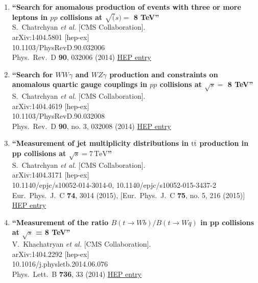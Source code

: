 \documentclass{article}
\begin{document}
\begin{enumerate}
\item%
{\bf ``Search for anomalous production of events with three or more leptons in $pp$ collisions at $\sqrt(s) =$ 8 TeV''}
  \\{}S.~Chatrchyan {\it et al.} [CMS Collaboration].
  \\{}arXiv:1404.5801 [hep-ex]
    \\{}10.1103/PhysRevD.90.032006
\\{}Phys.\ Rev.\ D {\bf 90}, 032006 (2014) %
\href{http://inspirehep.net/record/1291940}{HEP entry}


\item%
{\bf ``Search for $WW \gamma$ and $WZ \gamma$ production and constraints on anomalous quartic gauge couplings in $pp$ collisions at $\sqrt s =$ 8 TeV''}
  \\{}S.~Chatrchyan {\it et al.} [CMS Collaboration].
  \\{}arXiv:1404.4619 [hep-ex]
    \\{}10.1103/PhysRevD.90.032008
\\{}Phys.\ Rev.\ D {\bf 90}, no. 3, 032008 (2014) %
\href{http://inspirehep.net/record/1291135}{HEP entry}


\item%
{\bf ``Measurement of jet multiplicity distributions in $\mathrm {t}\overline{\mathrm {t}}$ production in pp collisions at $\sqrt{s} = 7\,\text {TeV} $''}
  \\{}S.~Chatrchyan {\it et al.} [CMS Collaboration].
  \\{}arXiv:1404.3171 [hep-ex]
    \\{}10.1140/epjc/s10052-014-3014-0, 10.1140/epjc/s10052-015-3437-2
\\{}Eur.\ Phys.\ J.\ C {\bf 74}, 3014 (2015), [Eur.\ Phys.\ J.\ C {\bf 75}, no. 5, 216 (2015)] %
\href{http://inspirehep.net/record/1290126}{HEP entry}


\item%
{\bf ``Measurement of the ratio $B(t \to Wb)/B(t \to Wq)$ in pp collisions at $\sqrt{s}$ = 8 TeV''}
  \\{}V.~Khachatryan {\it et al.} [CMS Collaboration].
  \\{}arXiv:1404.2292 [hep-ex]
    \\{}10.1016/j.physletb.2014.06.076
\\{}Phys.\ Lett.\ B {\bf 736}, 33 (2014) %
\href{http://inspirehep.net/record/1289223}{HEP entry}



\end{enumerate}
\end{document}
